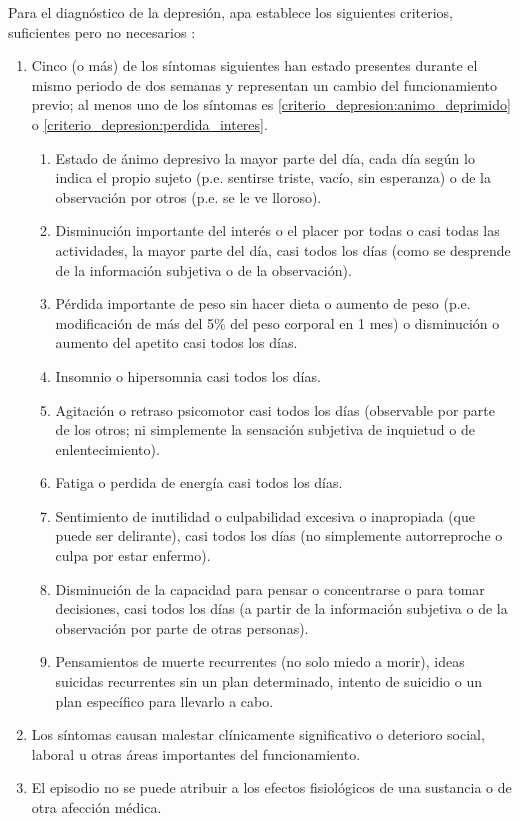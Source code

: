         Para el diagnóstico de la depresión, \gls{apa} establece los siguientes criterios, suficientes pero no necesarios \cite{american_psychological_association_manual_2014}:
        \begin{enumerate}[label={\alph*.}]
            \item Cinco (o más) de los síntomas siguientes han estado presentes durante el mismo periodo de dos semanas y representan un cambio del funcionamiento previo; al menos uno de los síntomas es \ref{criterio_depresion:animo_deprimido} o \ref{criterio_depresion:perdida_interes}. 
                \begin{enumerate}[label={\arabic*.}]
                    \item \label{criterio_depresion:animo_deprimido} Estado de ánimo depresivo la mayor parte del día, cada día según lo indica el propio sujeto (p.e. sentirse triste, vacío, sin esperanza) o de la observación por otros (p.e. se le ve lloroso).
                    \item \label{criterio_depresion:perdida_interes} Disminución importante del interés o el placer por todas o casi todas las actividades, la mayor parte del día, casi todos los días (como se desprende de la información subjetiva o de la observación).
                    \item Pérdida importante de peso sin hacer dieta o aumento de peso (p.e. modificación de más del 5\% del peso corporal en 1 mes) o disminución o aumento del apetito casi todos los días. 
                    \item Insomnio o hipersomnia casi todos los días.
                    \item Agitación o retraso psicomotor casi todos los días (observable por parte de los otros; ni simplemente la sensación subjetiva de inquietud o de enlentecimiento).
                    \item Fatiga o perdida de energía casi todos los días.
                    \item Sentimiento de inutilidad o culpabilidad excesiva o inapropiada (que puede ser delirante), casi todos los días (no simplemente autorreproche o culpa por estar enfermo).
                    \item Disminución de la capacidad para pensar o concentrarse o para tomar decisiones, casi todos los días (a partir de la información subjetiva o de la observación por parte de otras personas).
                    \item Pensamientos de muerte recurrentes (no solo miedo a morir), ideas suicidas recurrentes sin un plan determinado, intento de suicidio o un plan específico para llevarlo a cabo.
                \end{enumerate}
            \item Los síntomas causan malestar clínicamente significativo o deterioro social, laboral u otras áreas importantes del funcionamiento.
            \item El episodio no se puede atribuir a los efectos fisiológicos de una sustancia o de otra afección médica.
        \end{enumerate}
